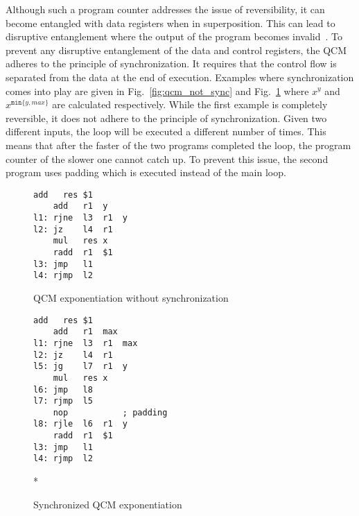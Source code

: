 Although such a program counter addresses the issue of reversibility, it can become entangled with data registers when in superposition. This can lead to disruptive entanglement where the output of the program becomes invalid~\cite{YVC24}. To prevent any disruptive entanglement of the data and control registers, the QCM adheres to the principle of synchronization. 
It requires that the control flow is separated from the data at the end of execution. 
Examples where synchronization comes into play are given in Fig.~\ref{fig:qcm_not_sync} and Fig.~\ref{fig:qcm_sync} where $x^y$ and $x^{\texttt{min}\{y, max\}}$ are calculated respectively. 
While the first example is completely reversible, it does not adhere to the principle of synchronization. Given two different inputs, the loop will be executed a different number of times. This means that after the faster of the two programs completed the loop, the program counter of the slower one cannot catch up. To prevent this issue, the second program uses padding which is executed instead of the main loop. 

\begin{figure}[htp]
    \centering     
    \begin{minipage}{.40\textwidth}
        \vspace{7.5em}
        \begin{lstlisting}[linewidth=17em,style=QCM]
    add   res $1
    add   r1  y
l1: rjne  l3  r1  y
l2: jz    l4  r1
    mul   res x
    radd  r1  $1
l3: jmp   l1  
l4: rjmp  l2      
        \end{lstlisting}
        \caption{QCM exponentiation without synchronization}
        \label{fig:qcm_not_sync}
    \end{minipage}
    \hfill
    \begin{minipage}{.55\textwidth}
        \begin{lstlisting}[linewidth=23em,style=QCM]
    add   res $1
    add   r1  max
l1: rjne  l3  r1  max
l2: jz    l4  r1
l5: jg    l7  r1  y   
    mul   res x
l6: jmp   l8  
l7: rjmp  l5
    nop           ; padding
l8: rjle  l6  r1  y
    radd  r1  $1
l3: jmp   l1
l4: rjmp  l2
        \end{lstlisting}*
        \caption{Synchronized QCM exponentiation}    
        \label{fig:qcm_sync}
    \end{minipage}
\end{figure}


